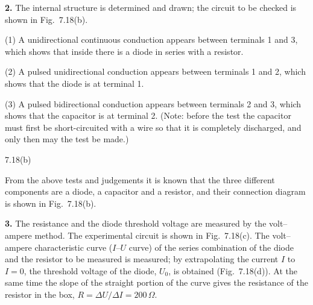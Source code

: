 \textbf{2.} The internal structure is determined and drawn; the circuit to be checked is shown in Fig.~7.18(b).

(1) A unidirectional continuous conduction appears between terminals 1 and 3, which shows that inside there is a diode in series with a resistor.

(2) A pulsed unidirectional conduction appears between terminals 1 and 2, which shows that the diode is at terminal 1.

(3) A pulsed bidirectional conduction appears between terminals 2 and 3, which shows that the capacitor is at terminal 2. (Note: before the test the capacitor must first be short-circuited with a wire so that it is completely discharged, and only then may the test be made.)

\begin{figbox}{7.18(b)}
\end{figbox}

From the above tests and judgements it is known that the three different components are a diode, a capacitor and a resistor, and their connection diagram is shown in Fig.~7.18(b).

\textbf{3.} The resistance and the diode threshold voltage are measured by the volt--ampere method. The experimental circuit is shown in Fig.~7.18(c). The volt--ampere characteristic curve ($I$--$U$ curve) of the series combination of the diode and the resistor to be measured is measured; by extrapolating the current $I$ to $I=0$, the threshold voltage of the diode, $U_0$, is obtained (Fig.~7.18(d)). At the same time the slope of the straight portion of the curve gives the resistance of the resistor in the box, $R=\Delta U/\Delta I=200\,\Omega$.


